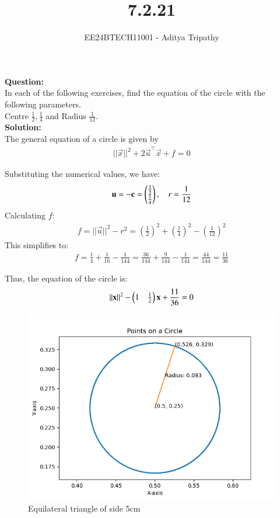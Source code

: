 \documentclass[journal]{IEEEtran}
\begin{document}

\vspace{3cm}

\title{7.2.21}
\author{EE24BTECH11001 - Aditya Tripathy
}
{\let\newpage\relax\maketitle}

\renewcommand{\thefigure}{\theenumi}
\renewcommand{\thetable}{\theenumi}
\setlength{\intextsep}{10pt} %

\textbf{Question:}\\
In each of the following exercises,  find the equation of the circle with the following parameters.\\
Centre $\frac{1}{2},  \frac{1}{4}$ and Radius $\frac{1}{12}$.
\\
\textbf{Solution:}\\
The general equation of a circle is given by 
\begin{align}
    ||\vec{x}||^2 + 2 \vec{u}^{\top}\vec{x} + f = 0
\end{align}

Substituting the numerical values, we have:
\begin{align}
    \mathbf{u} = -\mathbf{c} = \begin{pmatrix}\frac{1}{2} \\ \frac{1}{4}\end{pmatrix}, \quad r = \frac{1}{12}
\end{align}
Calculating \(f\):
\begin{align}
    f = ||\vec{u}||^2 - r^2 = \left(\frac{1}{2}\right)^2 + \left(\frac{1}{4}\right)^2 - \left(\frac{1}{12}\right)^2 
\end{align}
This simplifies to:
\begin{align}
    f = \frac{1}{4} + \frac{1}{16} - \frac{1}{144} = \frac{36}{144} + \frac{9}{144} - \frac{1}{144} = \frac{44}{144} = \frac{11}{36}
\end{align}

Thus, the equation of the circle is:
\begin{align}
    ||\mathbf{x}||^2 - \begin{pmatrix}1 & \frac{1}{2}\end{pmatrix} \mathbf{x} + \frac{11}{36} = 0
\end{align}

\begin{figure}[h!]
   \centering
   \includegraphics[width=0.7\linewidth]{figs/fig.png} %
   \caption{Equilateral triangle of side 5cm}
\end{figure}
\end{document}
